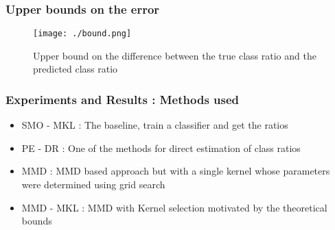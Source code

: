 \documentclass{beamer}
\begin{document}
\begin{frame}
 \frametitle{Upper bounds on the error}
\begin{figure}[h]
 \centering
 \texttt{[image: ./bound.png]}
 \caption{Upper bound on the difference between the true class ratio and the predicted class ratio}
\end{figure}

\end{frame}

\begin{frame}
\frametitle{Experiments and Results : Methods used}
\begin{itemize}
 \item SMO - MKL : The baseline, train a classifier and get the ratios \medskip
  \item PE - DR : One of the methods for direct estimation of class ratios \medskip
  \item MMD : MMD based approach but with a single kernel whose parameters were determined using grid search \medskip
  \item MMD - MKL : MMD with Kernel selection motivated by the theoretical bounds \medskip
\end{itemize}
\end{frame}
\end{document}
